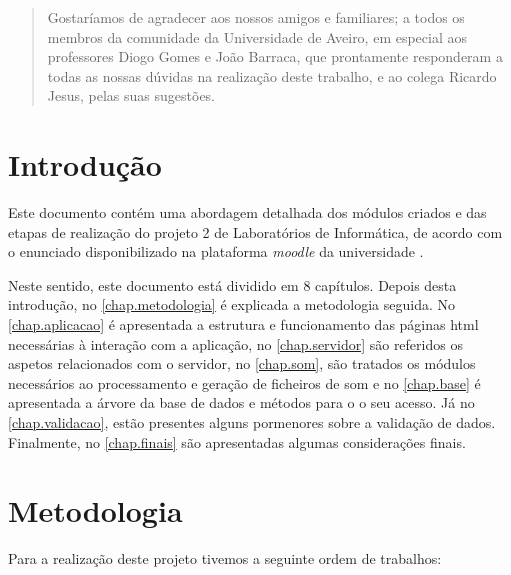 \documentclass{report}
\begin{document}
\renewcommand{\abstractname}{Agradecimentos}
\begin{abstract}
Gostaríamos de agradecer aos nossos amigos e familiares; a todos os membros da comunidade da Universidade de Aveiro, em especial aos  professores Diogo Gomes e João Barraca, que prontamente responderam a todas as nossas dúvidas na realização deste trabalho, e ao colega Ricardo Jesus, pelas suas sugestões.
\end{abstract}


\tableofcontents
\listoffigures


\clearpage
{}

\chapter{Introdução}
\label{chap.introducao}
Este documento contém uma abordagem detalhada dos módulos criados e das etapas de realização do projeto 2 de Laboratórios de Informática, de acordo com o enunciado disponibilizado na plataforma \textit{moodle} da universidade \cite{moodle}.

Neste sentido, este documento está dividido em 8 capítulos. Depois desta introdução, no \autoref{chap.metodologia} é explicada a metodologia seguida. No \autoref{chap.aplicacao} é apresentada a estrutura e funcionamento das páginas \ac{html} necessárias à interação com a aplicação, no \autoref{chap.servidor} são referidos os aspetos relacionados com o servidor, no \autoref{chap.som}, são tratados os módulos necessários ao processamento e geração de ficheiros de som e no \autoref{chap.base} é apresentada a árvore da base de dados e métodos para o o seu acesso. Já no \autoref{chap.validacao}, estão presentes alguns pormenores sobre a validação de dados. Finalmente, no \autoref{chap.finais} são apresentadas algumas considerações finais.


\chapter{Metodologia}
\label{chap.metodologia}

Para a realização deste projeto tivemos a seguinte ordem de trabalhos:
\end{document}
